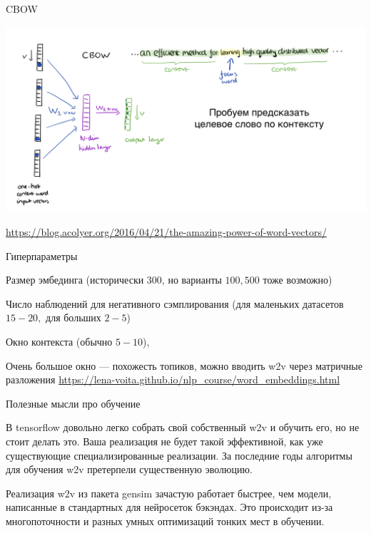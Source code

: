 \documentclass[notes,12pt, aspectratio=169]{beamer}
\newenvironment{wideitemize}{\itemize\addtolength{\itemsep}{10pt}}{\enditemize}
\begin{document}
\begin{frame}{CBOW}
\begin{center}
\includegraphics[width=.9\linewidth]{CBOW.png}
\end{center}
\vfill
\footnotesize  {\color{blue} \url{https://blog.acolyer.org/2016/04/21/the-amazing-power-of-word-vectors/}}
\end{frame} 


\begin{frame}{Гиперпараметры}
	\begin{wideitemize} 
			\item  Размер эмбединга (исторически $300$, но варианты $100, 500$ тоже возможно)
			
			\item  Число наблюдений для негативного сэмплирования (для маленьких датасетов $15-20,$ для больших $2-5$)
			
			\item  Окно контекста (обычно $5-10$), 
			
			\item  Очень большое окно —  похожесть топиков, можно вводить w2v через матричные разложения
		\end{wideitemize} 
\vfill
\footnotesize{\color{blue} \url{https://lena-voita.github.io/nlp_course/word_embeddings.html}}
\end{frame} 



\begin{frame}{Полезные мысли про обучение}
\begin{wideitemize} 
	\item В tensorflow довольно легко собрать свой собственный w2v и обучить его, но не стоит делать это.  Ваша реализация не будет такой эффективной, как уже существующие специализированные реализации. За последние годы алгоритмы для обучения w2v претерпели существенную эволюцию. 
	
	\item   Реализация w2v из пакета gensim зачастую работает быстрее, чем модели, написанные в стандартных для нейросеток бэкэндах. Это происходит из-за многопоточности и разных умных оптимизаций тонких мест в обучении. 
\end{wideitemize} 
\end{frame} 
\end{document}
